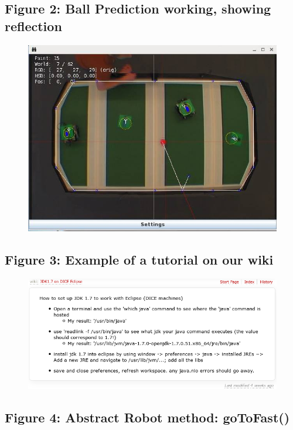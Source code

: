 \documentclass[a4paper,11pt]{article}
\begin{document}
\subsection{Figure 2: Ball Prediction working, showing reflection}

\begin{figure}[ht!]
\centering
\includegraphics[width=130mm]{system2.jpg}
\end{figure}

\subsection{Figure 3: Example of a tutorial on our wiki}

\begin{figure}[ht!]
\centering
\includegraphics[width=160mm]{tutorial-example.png}
\end{figure}

\subsection{Figure 4: Abstract Robot method: goToFast()}
\end{document}
